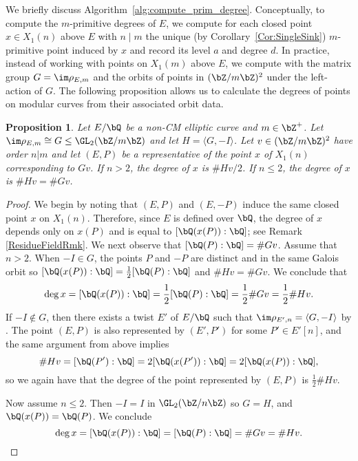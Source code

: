 \documentclass[11pt,reqno]{amsart}
\theoremstyle{plain}
\newtheorem{proposition}[theorem]{Proposition}
\theoremstyle{definition}
\newcommand{\Q}{\bQ}
\newcommand{\Z}{\bZ}
\begin{document}
We briefly discuss Algorithm~\ref{alg:compute_prim_degree}. Conceptually, to compute the $m$-primitive degrees of $E$, we compute for each closed point $x\in X_1(n)$ above $E$ with $n\mid m$ the unique (by Corollary~\ref{Cor:SingleSink}) $m$-primitive point induced by $x$ and record its level $a$ and degree $d$. In practice, instead of working with points on $X_1(m)$ above $E$, we compute with the matrix group $G=\im\rho_{E,m}$ and the orbits of points in $(\Z/m\Z)^2$ under the left-action of $G$. The following proposition allows us to calculate the degrees of points on modular curves from their associated orbit data.


\begin{proposition}\label{prop:compute_degrees}
Let $E/\Q$ be a non-CM elliptic curve and $m \in \Z^+$. Let $\im \rho_{E,m} \cong G \leq \GL_2(\Z/m\Z)$ and let $H=\langle G,-I\rangle$. Let $v\in (\Z/m\Z)^2$ have order $n|m$ and let $(E,P)$ be a representative of the point $x$ of $X_1(n)$  corresponding to $Gv$. If $n>2$, the degree of $x$ is $\#Hv/2$. If $n\leq 2$, the degree of $x$ is
$\#Hv=\#Gv$.
\end{proposition}

\begin{proof}
    We begin by noting that $(E, P)$ and $(E, -P)$ induce the same closed point $x$ on $X_1(n)$. Therefore, since $E$ is defined over $\Q$, the degree of
    $x$ depends only on $x(P)$ and is equal to $[\Q(x(P)):\Q]$; see Remark \ref{ResidueFieldRmk}.
    We next observe that $[\Q(P):\Q]=\#Gv$. Assume that $n>2$. When $-I\in G$, the points $P$ and $-P$ are distinct and in the same Galois orbit so $[\Q(x(P)):\Q]=\frac{1}{2}[\Q(P):\Q]$ and $\#Hv=\#Gv$. We conclude that
    \[
    \deg x = [\Q(x(P)):\Q] = \frac{1}{2}[\Q(P):\Q] = \frac{1}{2}\#Gv = \frac{1}{2}\#Hv.
    \]
    If $-I \notin G$, then there exists a twist $E'$ of $E/\Q$ such that $\im \rho_{E',n}=\langle G, -I \rangle$ by \cite[Corollary 5.25]{sutherland}. The point $(E,P)$ is also represented by $(E',P')$ for some $P'\in E'[n]$, and the same argument from above  implies
    \[
    \#Hv = [\Q(P'):\Q] = 2[\Q(x(P')):\Q] = 2[\Q(x(P)):\Q],
    \]
    so we again have that the degree of the point represented by $(E,P)$ is $\frac{1}{2}\#Hv$.

    Now assume $n\leq 2$. Then $-I=I$ in $\GL_2(\Z/n\Z)$ so $G=H$, and $\Q(x(P))=\Q(P)$. We conclude
    \[
    \deg x = [\Q(x(P)):\Q] = [\Q(P):\Q] = \#Gv = \#Hv. \qedhere
    \]
\end{proof}
\end{document}
